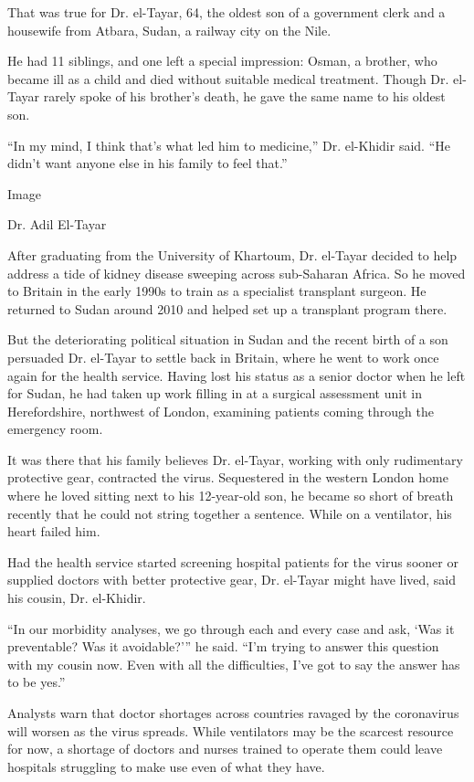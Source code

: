 That was true for Dr. el-Tayar, 64, the oldest son of a government clerk
and a housewife from Atbara, Sudan, a railway city on the Nile.

He had 11 siblings, and one left a special impression: Osman, a brother,
who became ill as a child and died without suitable medical treatment.
Though Dr. el-Tayar rarely spoke of his brother's death, he gave the
same name to his oldest son.

``In my mind, I think that's what led him to medicine,'' Dr. el-Khidir
said. ``He didn't want anyone else in his family to feel that.''

Image

Dr. Adil El-Tayar

After graduating from the University of Khartoum, Dr. el-Tayar decided
to help address a tide of kidney disease sweeping across sub-Saharan
Africa. So he moved to Britain in the early 1990s to train as a
specialist transplant surgeon. He returned to Sudan around 2010 and
helped set up a transplant program there.

But the deteriorating political situation in Sudan and the recent birth
of a son persuaded Dr. el-Tayar to settle back in Britain, where he went
to work once again for the health service. Having lost his status as a
senior doctor when he left for Sudan, he had taken up work filling in at
a surgical assessment unit in Herefordshire, northwest of London,
examining patients coming through the emergency room.

It was there that his family believes Dr. el-Tayar, working with only
rudimentary protective gear, contracted the virus. Sequestered in the
western London home where he loved sitting next to his 12-year-old son,
he became so short of breath recently that he could not string together
a sentence. While on a ventilator, his heart failed him.

Had the health service started screening hospital patients for the virus
sooner or supplied doctors with better protective gear, Dr. el-Tayar
might have lived, said his cousin, Dr. el-Khidir.

``In our morbidity analyses, we go through each and every case and ask,
`Was it preventable? Was it avoidable?''' he said. ``I'm trying to
answer this question with my cousin now. Even with all the difficulties,
I've got to say the answer has to be yes.''

Analysts warn that doctor shortages across countries ravaged by the
coronavirus will worsen as the virus spreads. While ventilators may be
the scarcest resource for now, a shortage of doctors and nurses trained
to operate them could leave hospitals struggling to make use even of
what they have.

